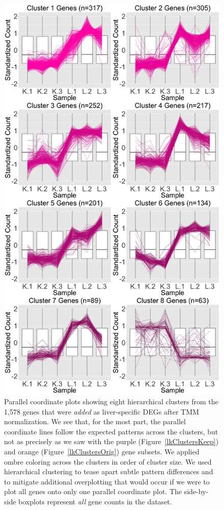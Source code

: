 \documentclass{article}
\begin{document}
  \null
  \begin{figure}[t!]
  \centerline{\includegraphics[width=0.65\columnwidth]{../MakeFigures/lkClustersAdd.jpg}}
  \caption{Parallel coordinate plots showing eight hierarchical clusters from the 1,578 genes that were \textit{added} as liver-specific DEGs after TMM normalization. We see that, for the most part, the parallel coordinate lines follow the expected patterns across the clusters, but not as precisely as we saw with the purple (Figure~\ref{lkClustersKeep}) and orange (Figure~\ref{lkClustersOrig}) gene subsets. We applied ombre coloring across the clusters in order of cluster size. We used hierarchical clustering to tease apart subtle pattern differences and to mitigate additional overplotting that would occur if we were to plot all genes onto only one parallel coordinate plot. The side-by-side boxplots represent \textit{all} gene counts in the dataset.
  \label{lkClustersAdd}}
  \end{figure}
  
\end{document}
